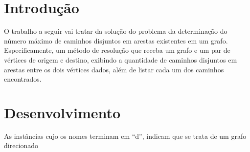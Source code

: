 \section{\esp Introdução}

O trabalho a seguir vai tratar da solução do problema da determinação do número máximo de caminhos disjuntos em arestas existentes em um grafo. Especificamente, um método de resolução que receba um grafo e um par de vértices de origem e destino, exibindo a quantidade de caminhos disjuntos em arestas entre os dois vértices dados, além de listar cada um dos caminhos encontrados.

\section{\esp Desenvolvimento}


As instâncias cujo os nomes terminam em “d”, indicam que se trata de um grafo direcionado

